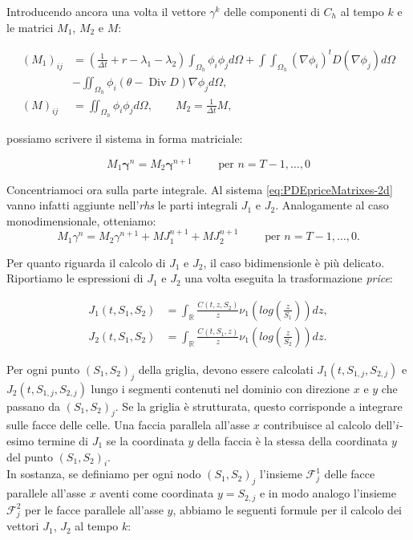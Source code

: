 \documentclass[a4paper,10pt]{report}
\theoremstyle{plain}
\theoremstyle{definition}
\theoremstyle{remark}
\DeclareMathOperator{\Div}{Div}
\begin{document}
Introducendo ancora una volta il vettore $\gamma^k$ delle componenti di $C_h$ al tempo $k$ e le matrici $M_1$, $M_2$ e $M$:

\begin{align*}
 (M_1)_{ij}&=\left(\frac{1}{\Delta t}+r-\lambda_1-\lambda_2\right)\int_{\Omega_h}\phi_i\phi_jd\Omega+\int\int_{\Omega_h}(\nabla\phi_i)^t D (\nabla\phi_j) d\Omega\\&
 -\iint_{\Omega_h}\phi_i(\theta-\Div D)\nabla\phi_j d\Omega,\\
 (M)_{ij}&=\iint_{\Omega_h}\phi_i\phi_j d\Omega, \qquad M_2=\frac{1}{\Delta t}M,
\end{align*}

possiamo scrivere il sistema in forma matriciale:

\begin{equation}
 \label{eq:PDEpriceMatrixes-2d}
 M_1 \bm{\gamma}^n=M_2\bm{\gamma}^{n+1} \qquad \text{ per } n=T-1,\dots,0
\end{equation}

Concentriamoci ora sulla parte integrale. Al sistema \eqref{eq:PDEpriceMatrixes-2d} vanno infatti aggiunte nell'\emph{rhs} le parti integrali $J_1$ e $J_2$. Analogamente al caso monodimensionale, otteniamo:
\begin{equation}
 \label{eq:PDEpriceMatrixeswithJ-2d}
 M_1 \gamma^n=M_2\gamma^{n+1}+MJ_1^{n+1}+MJ_2^{n+1}\qquad \text{ per } n=T-1,\dots,0.
\end{equation}

Per quanto riguarda il calcolo di $J_1$ e $J_2$, il caso bidimensionle è più delicato. Riportiamo le espressioni di $J_1$ e $J_2$ una volta eseguita la trasformazione \emph{price}:

\begin{align*}
 J_1(t,S_1,S_2)&= \int_\mathbb{R} \frac{C(t,z,S_2)}{z}\nu_1\left(log\left(\frac{z}{S_1}\right)\right)dz,\\
 J_2(t,S_1,S_2)&= \int_\mathbb{R} \frac{C(t,S_1,z)}{z}\nu_1\left(log\left(\frac{z}{S_2}\right)\right)dz.
\end{align*}

Per ogni punto $(S_1,S_2)_j$ della griglia, devono essere calcolati $J_1(t,S_{1,j},S_{2,j})$ e $J_2(t,S_{1,j},S_{2,j})$ lungo i segmenti contenuti nel dominio con direzione $x$ e $y$ che passano da $(S_1,S_2)_j$. Se la griglia è strutturata, questo corrisponde a integrare sulle facce delle celle. Una faccia parallela all'asse $x$ contribuisce al calcolo dell'$i$-esimo termine di $J_1$ se la coordinata $y$ della faccia è la stessa della coordinata $y$ del punto $(S_1,S_2)_i$.\\
In sostanza, se definiamo per ogni nodo $(S_1,S_2)_j$ l'insieme $\mathcal{F}^1_j$ delle facce parallele all'asse $x$ aventi come coordinata $y=S_{2,j}$ e in modo analogo l'insieme $\mathcal{F}^2_j$ per le facce parallele all'asse $y$, abbiamo le seguenti formule per il calcolo dei vettori $J_1$, $J_2$ al tempo $k$:
\end{document}
